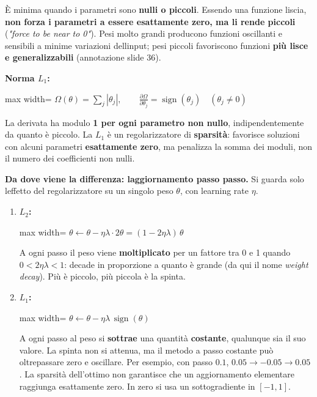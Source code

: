 \documentclass[11pt,a4paper,oneside,openany]{book}
\providecommand{\tightlist}{\setlength{\itemsep}{0pt}\setlength{\parskip}{0pt}}
\begin{document}
È minima quando i parametri sono \textbf{nulli o piccoli}. Essendo una funzione liscia, \textbf{non forza i parametri a essere esattamente zero, ma li rende piccoli} (\emph{"force to be near to 0"}). Pesi molto grandi producono funzioni oscillanti e sensibili a minime variazioni dell\textquotesingle input; pesi piccoli favoriscono funzioni \textbf{più lisce e generalizzabili} (annotazione slide 36).

\textbf{Norma \(L_1\):}

\begin{center}
\begin{adjustbox}{max width=\linewidth}
$\displaystyle 
\Omega(\theta) = \sum_j |\theta_j|, \qquad \frac{\partial\Omega}{\partial\theta_j} = \operatorname{sign}(\theta_j)\quad(\theta_j \neq 0)
$
\end{adjustbox}
\end{center}

La derivata ha modulo \textbf{1 per ogni parametro non nullo}, indipendentemente da quanto è piccolo. La \(L_1\) è un regolarizzatore di \textbf{sparsità}: favorisce soluzioni con alcuni parametri \textbf{esattamente zero}, ma penalizza la somma dei moduli, non il numero dei coefficienti non nulli.

\textbf{Da dove viene la differenza: l\textquotesingle aggiornamento passo passo.} Si guarda solo l\textquotesingle effetto del regolarizzatore su un singolo peso \(\theta\), con learning rate \(\eta\).

\begin{enumerate}
\def\labelenumi{\arabic{enumi}.}
\tightlist
\item
  \textbf{\(L_2\):} \begin{center}
\begin{adjustbox}{max width=\linewidth}
$\displaystyle \theta \leftarrow \theta - \eta\lambda\cdot 2\theta = (1 - 2\eta\lambda)\,\theta$
\end{adjustbox}
\end{center} A ogni passo il peso viene \textbf{moltiplicato} per un fattore tra 0 e 1 quando \(0<2\eta\lambda<1\): decade in proporzione a quanto è grande (da qui il nome \emph{weight decay}). Più è piccolo, più piccola è la spinta.
\item
  \textbf{\(L_1\):} \begin{center}
\begin{adjustbox}{max width=\linewidth}
$\displaystyle \theta \leftarrow \theta - \eta\lambda\,\operatorname{sign}(\theta)$
\end{adjustbox}
\end{center} A ogni passo al peso si \textbf{sottrae} una quantità \textbf{costante}, qualunque sia il suo valore. La spinta non si attenua, ma il metodo a passo costante può oltrepassare zero e oscillare. Per esempio, con passo \(0.1\), \(0.05\to-0.05\to0.05\). La sparsità dell'ottimo non garantisce che un aggiornamento elementare raggiunga esattamente zero. In zero si usa un sottogradiente in \([-1,1]\).
\end{enumerate}
\end{document}
